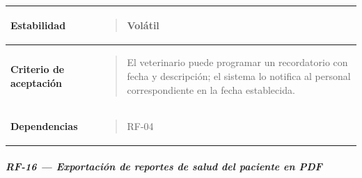 \documentclass[
]{article}
\newcounter{none} %
\begin{document}
{\def\LTcaptype{none} %
\begin{longtable}[]{@{}
  >{\raggedright\arraybackslash}p{}
  >{\raggedright\arraybackslash}p{}@{}}
\toprule\noalign{}
\begin{minipage}[b]{\linewidth}\raggedright
\textbf{Estabilidad}
\end{minipage} & \begin{minipage}[b]{\linewidth}\raggedright
\begin{quote}
Volátil
\end{quote}
\end{minipage} \\
\midrule\noalign{}
\endhead
\bottomrule\noalign{}
\endlastfoot
\textbf{Criterio de aceptación} &
\begin{minipage}[t]{\linewidth}\raggedright
\begin{quote}
El veterinario puede programar un recordatorio con fecha y descripción;
el sistema lo notifica al personal correspondiente en la fecha
establecida.
\end{quote}
\end{minipage} \\
\textbf{Dependencias} & \begin{minipage}[t]{\linewidth}\raggedright
\begin{quote}
RF-04
\end{quote}
\end{minipage} \\
\end{longtable}
}

\subparagraph{RF-16 --- Exportación de reportes de salud del paciente en
PDF}\label{rf-16-exportaciuxf3n-de-reportes-de-salud-del-paciente-en-pdf}
\end{document}

